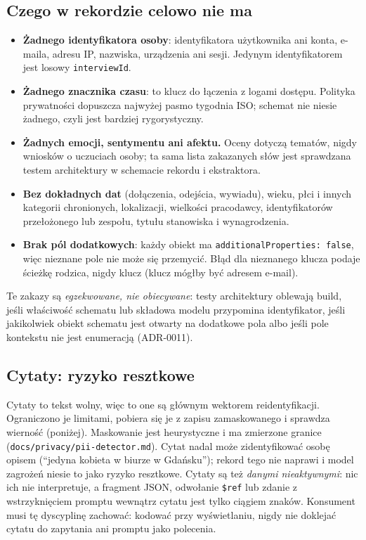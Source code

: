 \subsection{Czego w rekordzie celowo nie ma}

\begin{itemize}[itemsep=2pt]
  \item \textbf{Żadnego identyfikatora osoby}: identyfikatora użytkownika ani
        konta, e-maila, adresu IP, nazwiska, urządzenia ani sesji. Jedynym
        identyfikatorem jest losowy \texttt{interviewId}.
  \item \textbf{Żadnego znacznika czasu}: to klucz do łączenia z logami dostępu.
        Polityka prywatności dopuszcza najwyżej pasmo tygodnia ISO; schemat nie
        niesie żadnego, czyli jest bardziej rygorystyczny.
  \item \textbf{Żadnych emocji, sentymentu ani afektu.} Oceny dotyczą tematów,
        nigdy wniosków o uczuciach osoby; ta sama lista zakazanych słów jest
        sprawdzana testem architektury w schemacie rekordu i ekstraktora.
  \item \textbf{Bez dokładnych dat} (dołączenia, odejścia, wywiadu), wieku,
        płci i innych kategorii chronionych, lokalizacji, wielkości pracodawcy,
        identyfikatorów przełożonego lub zespołu, tytułu stanowiska i
        wynagrodzenia.
  \item \textbf{Brak pól dodatkowych}: każdy obiekt ma
        \texttt{additionalProperties: false}, więc nieznane pole nie może się
        przemycić. Błąd dla nieznanego klucza podaje ścieżkę rodzica, nigdy
        klucz (klucz mógłby być adresem e-mail).
\end{itemize}

Te zakazy są \emph{egzekwowane, nie obiecywane}: testy architektury oblewają
build, jeśli właściwość schematu lub składowa modelu przypomina identyfikator,
jeśli jakikolwiek obiekt schematu jest otwarty na dodatkowe pola albo jeśli
pole kontekstu nie jest enumeracją (ADR-0011).

\subsection{Cytaty: ryzyko resztkowe}

Cytaty to tekst wolny, więc to one są głównym wektorem reidentyfikacji.
Ograniczono je limitami, pobiera się je z zapisu zamaskowanego i sprawdza
wierność (poniżej). Maskowanie jest heurystyczne i ma zmierzone granice
(\texttt{docs/privacy/pii-detector.md}). Cytat nadal może zidentyfikować osobę
opisem (``jedyna kobieta w biurze w Gdańsku''); rekord tego nie naprawi i model
zagrożeń niesie to jako ryzyko resztkowe. Cytaty są też \emph{danymi
nieaktywnymi}: nic ich nie interpretuje, a fragment JSON, odwołanie \texttt{\$ref}
lub zdanie z wstrzyknięciem promptu wewnątrz cytatu jest tylko ciągiem znaków.
Konsument musi tę dyscyplinę zachować: kodować przy wyświetlaniu, nigdy nie
doklejać cytatu do zapytania ani promptu jako polecenia.

